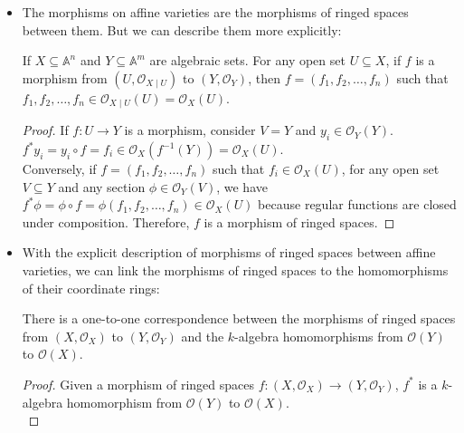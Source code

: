 \documentclass[15pt]{scrartcl}
\newcommand{\A}{\mathbb{A}}
\newcommand{\cO}{\mathcal{O}}
\newcommand{\pre}{^{-1}}
\begin{document}
\begin{itemize}
\begin{example}
        But why? How do we show it's not a morphism of ringed spaces? Motivated by this question, we need a more concrete description of morphisms of ringed spaces between affine varieties.
    \end{example}
    \item The morphisms on affine varieties are the morphisms of ringed spaces between them. But we can describe them more explicitly:
   \begin{theorem}
    If $X\subseteq \A^n$ and $Y\subseteq \A^m$ are algebraic sets. For any open set $U\subseteq X$, if $f$ is a morphism from $(U,\cO_{X\mid U})$ to $(Y,\cO_Y)$, then $f=(f_1,f_2,\ldots, f_n)$ such that $f_1, f_2, \ldots, f_n\in \cO_{X\mid U}(U)=\cO_X(U)$. 
    \end{theorem}
    \begin{proof}
        If $f:U\to Y$ is a morphism, consider $V=Y$ and $y_i\in \cO_Y(Y)$. $f^*y_i=y_i\circ f=f_i\in \cO_X(f\pre(Y))=\cO_X(U)$. 
        \\
        Conversely, if $f=(f_1,f_2,\ldots, f_n)$ such that $f_i\in \cO_X(U)$, for any open set $V\subseteq Y$ and any section $\phi\in \cO_Y(V)$, we have $f^*\phi=\phi\circ f=\phi(f_1,f_2,\ldots, f_n)\in \cO_X(U)$ because regular functions are closed under composition. Therefore, $f$ is a morphism of ringed spaces.
    \end{proof}
    \item With the explicit description of morphisms of ringed spaces between affine varieties, we can link the morphisms of ringed spaces to the homomorphisms of their coordinate rings:
    \begin{theorem}
        There is a one-to-one correspondence between the morphisms of ringed spaces from $(X,\cO_X)$ to $(Y,\cO_Y)$ and the $k$-algebra homomorphisms from $\cO(Y)$ to $\cO(X)$.
    \end{theorem}
    \begin{proof}
        Given a morphism of ringed spaces $f:(X,\cO_X)\to (Y,\cO_Y)$, $f^*$ is a $k$-algebra homomorphism from $\cO(Y)$ to $\cO(X)$.
        \\


\end{proof}
\end{itemize}
\end{document}
